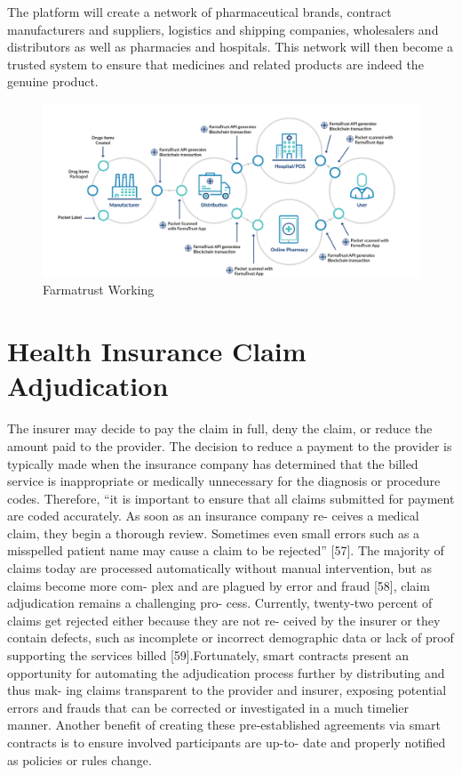\documentclass[12pt]{report}
\begin{document}
The platform will create a network of pharmaceutical brands, contract manufacturers and suppliers, logistics and shipping companies, wholesalers and distributors as well as pharmacies and hospitals. This network will then become a trusted system to ensure that medicines and related products are indeed the genuine product.
\begin{figure}[H]
\centering
\includegraphics[width=1.1\textwidth]{farma.png}
\caption{Farmatrust Working}
\label{ppr}
\end{figure}


\section{Health Insurance Claim Adjudication}
The insurer may decide to pay the claim in full, deny the claim, or reduce the amount
paid to the provider. The decision to reduce a payment to the provider is typically made when
the insurance company has determined that the billed service is inappropriate or medically
unnecessary for the diagnosis or procedure codes. Therefore, “it is important to ensure that all
claims submitted for payment are coded accurately. As soon as an insurance company re-
ceives a medical claim, they begin a thorough review. Sometimes even small errors such as a
misspelled patient name may cause a claim to be rejected” [57]. The majority of claims today
are processed automatically without manual intervention, but as claims become more com-
plex and are plagued by error and fraud [58], claim adjudication remains a challenging pro-
cess.
Currently, twenty-two percent of claims get rejected either because they are not re-
ceived by the insurer or they contain defects, such as incomplete or incorrect demographic
data or lack of proof supporting the services billed [59].Fortunately, smart contracts present
an opportunity for automating the adjudication process further by distributing and thus mak-
ing claims transparent to the provider and insurer, exposing potential errors and frauds that
can be corrected or investigated in a much timelier manner. Another benefit of creating these
pre-established agreements via smart contracts is to ensure involved participants are up-to-
date and properly notified as policies or rules change.
\end{document}
